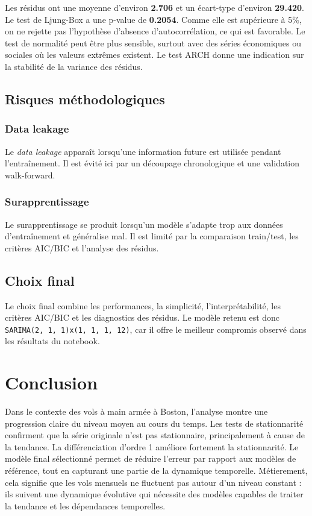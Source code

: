 \documentclass[12pt,a4paper]{report}
\begin{document}
Les résidus ont une moyenne d'environ \textbf{2.706} et un écart-type d'environ \textbf{29.420}. Le test de Ljung-Box a une p-value de \textbf{0.2054}. Comme elle est supérieure à 5\%, on ne rejette pas l'hypothèse d'absence d'autocorrélation, ce qui est favorable. Le test de normalité peut être plus sensible, surtout avec des séries économiques ou sociales où les valeurs extrêmes existent. Le test ARCH donne une indication sur la stabilité de la variance des résidus.

\section{Risques méthodologiques}
\subsection{Data leakage}
Le \textit{data leakage} apparaît lorsqu'une information future est utilisée pendant l'entraînement. Il est évité ici par un découpage chronologique et une validation walk-forward.

\subsection{Surapprentissage}
Le surapprentissage se produit lorsqu'un modèle s'adapte trop aux données d'entraînement et généralise mal. Il est limité par la comparaison train/test, les critères AIC/BIC et l'analyse des résidus.

\section{Choix final}
Le choix final combine les performances, la simplicité, l'interprétabilité, les critères AIC/BIC et les diagnostics des résidus. Le modèle retenu est donc \texttt{SARIMA(2, 1, 1)x(1, 1, 1, 12)}, car il offre le meilleur compromis observé dans les résultats du notebook.

\chapter{Conclusion}
Dans le contexte des vols à main armée à Boston, l'analyse montre une progression claire du niveau moyen au cours du temps. Les tests de stationnarité confirment que la série originale n'est pas stationnaire, principalement à cause de la tendance. La différenciation d'ordre 1 améliore fortement la stationnarité. Le modèle final sélectionné permet de réduire l'erreur par rapport aux modèles de référence, tout en capturant une partie de la dynamique temporelle. Métierement, cela signifie que les vols mensuels ne fluctuent pas autour d'un niveau constant : ils suivent une dynamique évolutive qui nécessite des modèles capables de traiter la tendance et les dépendances temporelles.
\end{document}
